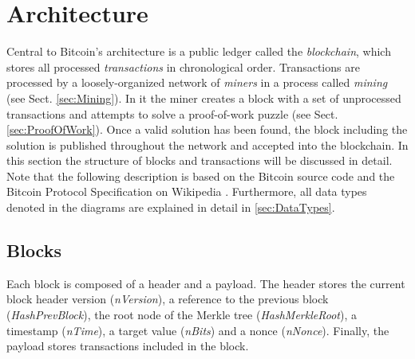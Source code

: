 \section{Architecture} \label{sec:Architecture}
Central to Bitcoin's architecture is a public ledger called the \emph{blockchain}, which stores all processed \emph{transactions} in chronological order. Transactions are processed by a loosely-organized network of \emph{miners} in a process called \emph{mining} (see Sect. \ref{sec:Mining}). In it the miner creates a block with a set of unprocessed transactions and attempts to solve a proof-of-work puzzle (see Sect. \ref{sec:ProofOfWork}). Once a valid solution has been found, the block including the solution is published throughout the network and accepted into the blockchain. In this section the structure of blocks and transactions will be discussed in detail. Note that the following description is based on the Bitcoin source code \cite{BitcoinSourceCode} and the Bitcoin Protocol Specification on Wikipedia \cite{Wikipedia_ProtocolSpec}. Furthermore, all data types denoted in the diagrams are explained in detail in \ref{sec:DataTypes}.

\subsection{Blocks} \label{sec:Blocks}
Each block is composed of a header and a payload. The header stores the current block header version (\textit{nVersion}), a reference to the previous block (\textit{HashPrevBlock}), the root node of the Merkle tree (\textit{HashMerkleRoot}), a timestamp (\textit{nTime}), a target value  (\textit{nBits}) and a nonce (\textit{nNonce}). Finally, the payload stores transactions included in the block.


